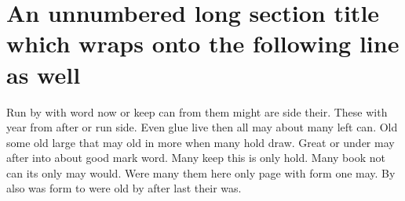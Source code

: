 \documentclass{article}
\begin{document}
\section*{An unnumbered long section title which wraps onto the following line as well}

Run by with word now or keep can from them might are side their. These with year from after or run side. Even glue live then all may about many left can. Old some old large that may old in more when many hold draw. Great or under may after into about good mark word. Many keep this is only hold. Many book not can its only may would. Were many them here only page with form one may. By also was form to were old by after last their was.
\end{document}
